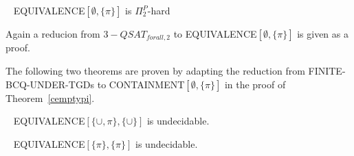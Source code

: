 \begin{theorem}~\cite{pichler2014containment}
EQUIVALENCE$[\emptyset,\{\pi\}]$ is $\Pi_2^P$-hard
\end{theorem}
\begin{proofidea}
Again a reducion from $3-QSAT_{forall,2}$ to  EQUIVALENCE$[\emptyset,\{\pi\}]$
is given as a proof.
\end{proofidea}

The following two theorems are proven by adapting the reduction from
FINITE-BCQ-UNDER-TGDs to CONTAINMENT$[\emptyset,\{\pi\}]$ in the proof of 
Theorem~\ref{cemptypi}.
\begin{theorem}~\cite{pichler2014containment}
EQUIVALENCE$[\{\cup,\pi\},\{\cup\}]$ is undecidable.
\end{theorem}
\begin{theorem}~\cite{pichler2014containment}
EQUIVALENCE$[\{\pi\},\{\pi\}]$ is undecidable.
\end{theorem}
